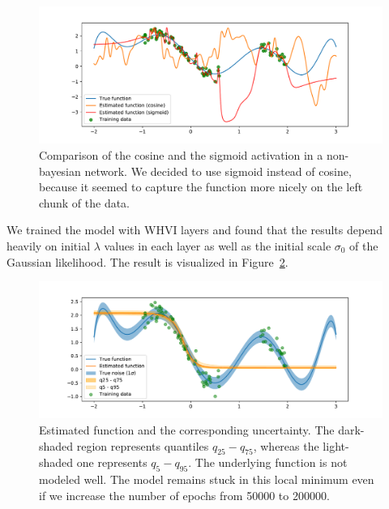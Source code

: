 \documentclass[11pt, twocolumn]{article}
\begin{document}
    \begin{figure}
        \centering
        \includegraphics[width=1.0\hsize]{img/toy-function-non-bayesian.pdf}
        \caption{Comparison of the cosine and the sigmoid activation in a non-bayesian network.
        We decided to use sigmoid instead of cosine, because it seemed to capture the function more nicely on the left chunk of the data.}
        \label{fig:toy-function-non-bayesian}
    \end{figure}

    We trained the model with WHVI layers and found that the results depend heavily on initial $\lambda$ values in each layer as well as the initial scale $\sigma_0$ of the Gaussian likelihood.
    The result is visualized in Figure~\ref{fig:toy-function-whvi}.
    \begin{figure}[htbp]
        \centering
        \includegraphics[width=1.0\hsize]{img/bayesian-fit-with-kl.pdf}
        \caption{
        Estimated function and the corresponding uncertainty.
        The dark-shaded region represents quantiles $q_{25}-q_{75}$, whereas the light-shaded one represents $q_{5}-q_{95}$.
        The underlying function is not modeled well.
        The model remains stuck in this local minimum even if we increase the number of epochs from 50000 to 200000.}
        \label{fig:toy-function-whvi}
    \end{figure}
\end{document}

